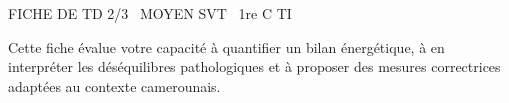 \documentclass[11pt]{article}
\begin{document}
\begin{tcolorbox}[enhanced,colback=popink,colframe=popink,arc=10pt,boxrule=0pt,left=12pt,right=12pt,top=9pt,bottom=9pt]
{\color{white}\popxbold\small FICHE DE TD 2/3 \textbullet\ MOYEN \hfill SVT \textbullet\ 1re C TI\par}
\end{tcolorbox}
\vspace{4pt}
Cette fiche évalue votre capacité à quantifier un bilan énergétique, à en interpréter les déséquilibres pathologiques et à proposer des mesures correctrices adaptées au contexte camerounais.
\end{document}
